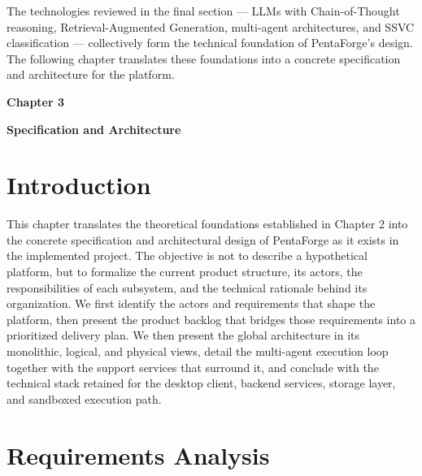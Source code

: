 \documentclass[12pt,a4paper]{report}
\begin{document}
The technologies reviewed in the final section --- LLMs with Chain-of-Thought
reasoning, Retrieval-Augmented Generation, multi-agent architectures, and SSVC
classification --- collectively form the technical foundation of PentaForge's design.
The following chapter translates these foundations into a concrete specification and
architecture for the platform.

\pagestyle{fancy}
\newpage
\pagestyle{chapterthree}

\vspace*{4cm}

{\fontsize{26}{30}\selectfont \textbf{Chapter 3}}\par

\vspace{1cm}

{\LARGE\bfseries Specification and Architecture}

\vspace{0.8cm}

\setcounter{chapter}{3}
\setcounter{section}{0}

\section{Introduction}

This chapter translates the theoretical foundations established in Chapter 2 into
the concrete specification and architectural design of PentaForge as it exists in
the implemented project. The objective is not to describe a hypothetical platform,
but to formalize the current product structure, its actors, the responsibilities of
each subsystem, and the technical rationale behind its organization. We first
identify the actors and requirements that shape the platform, then present the
product backlog that bridges those requirements into a prioritized delivery plan.
We then present the global architecture in its monolithic, logical, and physical
views, detail the multi-agent execution loop together with the support services
that surround it, and conclude with the technical stack retained for the desktop
client, backend services, storage layer, and sandboxed execution path.

\section{Requirements Analysis}
\label{sec:requirements}
\end{document}
